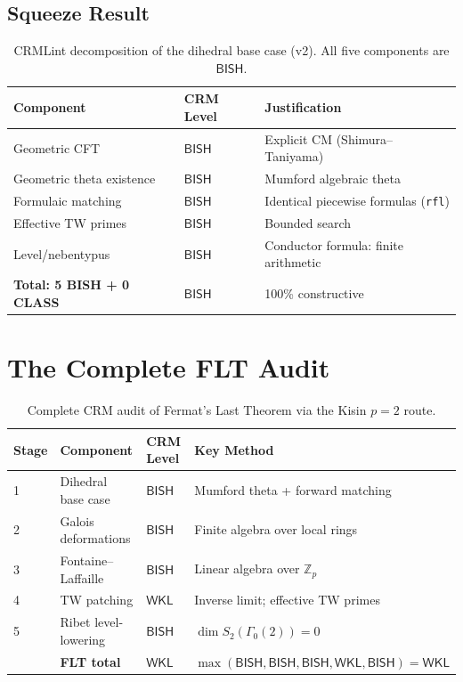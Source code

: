 \documentclass[11pt,a4paper]{article}
\theoremstyle{plain}
\theoremstyle{definition}
\newcommand{\BISH}{\textsf{BISH}}
\newcommand{\WKL}{\textsf{WKL}}
\newcommand{\Z}{\mathbb{Z}}
\begin{document}
\subsection{Squeeze Result}

\begin{table}[h]
\centering
\begin{tabular}{@{}lll@{}}
\toprule
\textbf{Component} & \textbf{CRM Level} & \textbf{Justification} \\
\midrule
Geometric CFT & $\BISH$ & Explicit CM (Shimura--Taniyama) \\
Geometric theta existence & $\BISH$ & Mumford algebraic theta~\cite{mumford66} \\
Formulaic matching & $\BISH$ & Identical piecewise formulas (\texttt{rfl}) \\
Effective TW primes & $\BISH$ & Bounded search~\cite{lagarias-odlyzko77} \\
Level/nebentypus & $\BISH$ & Conductor formula: finite arithmetic \\
\midrule
\textbf{Total: 5 BISH + 0 CLASS} & $\BISH$ & 100\% constructive \\
\bottomrule
\end{tabular}
\caption{CRMLint decomposition of the dihedral base case (v2). All five components are $\BISH$.}
\label{tab:crmlint}
\end{table}


\section{The Complete FLT Audit}\label{sec:flt-audit}

\begin{table}[h]
\centering
\begin{tabular}{@{}lllp{5.5cm}@{}}
\toprule
\textbf{Stage} & \textbf{Component} & \textbf{CRM Level} & \textbf{Key Method} \\
\midrule
1 & Dihedral base case & $\BISH$ & Mumford theta + forward matching \\
2 & Galois deformations & $\BISH$ & Finite algebra over local rings \\
3 & Fontaine--Laffaille & $\BISH$ & Linear algebra over $\Z_p$ \\
4 & TW patching & $\WKL$ & Inverse limit; effective TW primes \\
5 & Ribet level-lowering & $\BISH$ & $\dim S_2(\Gamma_0(2)) = 0$ \\
\midrule
& \textbf{FLT total} & $\WKL$ & $\max(\BISH, \BISH, \BISH, \WKL, \BISH) = \WKL$ \\
\bottomrule
\end{tabular}
\caption{Complete CRM audit of Fermat's Last Theorem via the Kisin $p = 2$ route.}
\label{tab:flt-complete}
\end{table}
\end{document}
